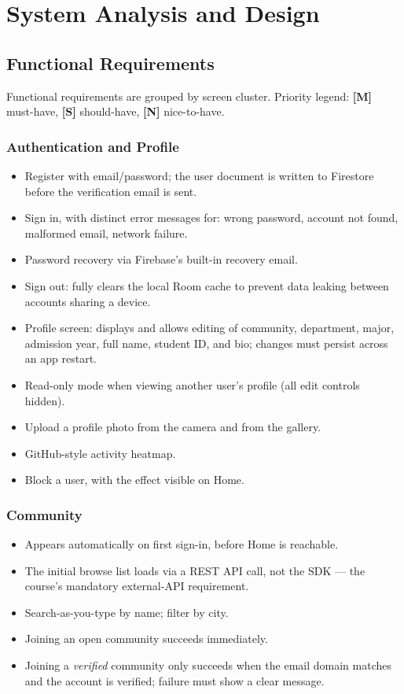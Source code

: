\section{System Analysis and Design}

\subsection{Functional Requirements}
\label{sec:functreq}

Functional requirements are grouped by screen cluster. Priority legend: \textbf{[M]} must-have, \textbf{[S]} should-have, \textbf{[N]} nice-to-have.

\subsubsection{Authentication and Profile}
\begin{itemize}
    \item [M] Register with email/password; the user document is written to Firestore before the verification email is sent.
    \item [M] Sign in, with distinct error messages for: wrong password, account not found, malformed email, network failure.
    \item [M] Password recovery via Firebase's built-in recovery email.
    \item [M] Sign out: fully clears the local Room cache to prevent data leaking between accounts sharing a device.
    \item [M] Profile screen: displays and allows editing of community, department, major, admission year, full name, student ID, and bio; changes must persist across an app restart.
    \item [M] Read-only mode when viewing another user's profile (all edit controls hidden).
    \item [S] Upload a profile photo from the camera and from the gallery.
    \item [N] GitHub-style activity heatmap.
    \item [N] Block a user, with the effect visible on Home.
\end{itemize}

\subsubsection{Community}
\begin{itemize}
    \item [M] Appears automatically on first sign-in, before Home is reachable.
    \item [M] The initial browse list loads via a REST API call, not the SDK — the course's mandatory external-API requirement.
    \item [M] Search-as-you-type by name; filter by city.
    \item [M] Joining an open community succeeds immediately.
    \item [M] Joining a \emph{verified} community only succeeds when the email domain matches and the account is verified; failure must show a clear message.
\end{itemize}

